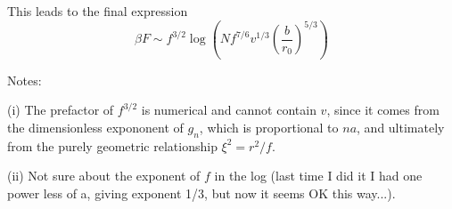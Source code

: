 \documentclass[a4paper,12pt,pre,superscriptaddress]{revtex4}
\begin{document}
This leads to the final expression
\begin{displaymath}
  \beta F \sim f^{3/2} \log 
  \left(  N f^{7/6} v^{1/3}  \left(\frac{b}{r_0} \right)^{5/3} \right)
\end{displaymath}

Notes:

(i) The prefactor of $f^{3/2}$ is numerical and cannot contain $v$,
since it comes from the dimensionless expononent of $g_n$, which is
proportional to $n a$, and ultimately from the purely geometric
relationship $\xi^2 = r^2/f$.

(ii) Not sure about the exponent of $f$ in the log (last time I did it
I had one power less of a, giving exponent 1/3, but now it seems OK
this way...).

\end{document}
